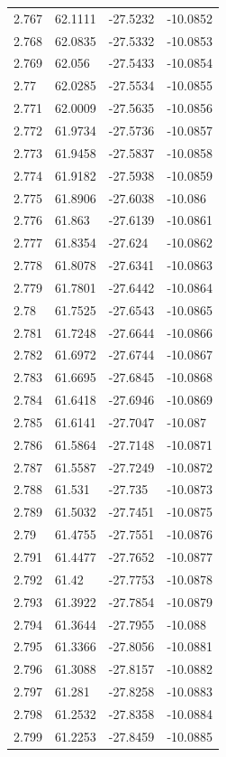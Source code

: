 \begin{tabular}{llll}
2.767 & 62.1111 & -27.5232 & -10.0852 \\
2.768 & 62.0835 & -27.5332 & -10.0853 \\
2.769 & 62.056 & -27.5433 & -10.0854 \\
2.77 & 62.0285 & -27.5534 & -10.0855 \\
2.771 & 62.0009 & -27.5635 & -10.0856 \\
2.772 & 61.9734 & -27.5736 & -10.0857 \\
2.773 & 61.9458 & -27.5837 & -10.0858 \\
2.774 & 61.9182 & -27.5938 & -10.0859 \\
2.775 & 61.8906 & -27.6038 & -10.086 \\
2.776 & 61.863 & -27.6139 & -10.0861 \\
2.777 & 61.8354 & -27.624 & -10.0862 \\
2.778 & 61.8078 & -27.6341 & -10.0863 \\
2.779 & 61.7801 & -27.6442 & -10.0864 \\
2.78 & 61.7525 & -27.6543 & -10.0865 \\
2.781 & 61.7248 & -27.6644 & -10.0866 \\
2.782 & 61.6972 & -27.6744 & -10.0867 \\
2.783 & 61.6695 & -27.6845 & -10.0868 \\
2.784 & 61.6418 & -27.6946 & -10.0869 \\
2.785 & 61.6141 & -27.7047 & -10.087 \\
2.786 & 61.5864 & -27.7148 & -10.0871 \\
2.787 & 61.5587 & -27.7249 & -10.0872 \\
2.788 & 61.531 & -27.735 & -10.0873 \\
2.789 & 61.5032 & -27.7451 & -10.0875 \\
2.79 & 61.4755 & -27.7551 & -10.0876 \\
2.791 & 61.4477 & -27.7652 & -10.0877 \\
2.792 & 61.42 & -27.7753 & -10.0878 \\
2.793 & 61.3922 & -27.7854 & -10.0879 \\
2.794 & 61.3644 & -27.7955 & -10.088 \\
2.795 & 61.3366 & -27.8056 & -10.0881 \\
2.796 & 61.3088 & -27.8157 & -10.0882 \\
2.797 & 61.281 & -27.8258 & -10.0883 \\
2.798 & 61.2532 & -27.8358 & -10.0884 \\
2.799 & 61.2253 & -27.8459 & -10.0885 \\

\end{tabular}
